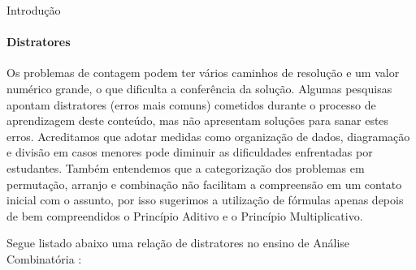 \begin{apresentacao}{Introdução}
\begin{itemize}
\end{itemize}

\paragraph{Distratores}

Os problemas de contagem podem ter vários caminhos de resolução e um valor numérico grande, o que dificulta a conferência da solução. Algumas pesquisas apontam distratores (erros mais comuns) cometidos durante o processo de aprendizagem deste conteúdo, mas não apresentam soluções para sanar estes erros. Acreditamos que adotar medidas como organização de dados, diagramação  e divisão em casos menores pode diminuir as dificuldades enfrentadas por estudantes. Também entendemos que a categorização dos problemas em permutação, arranjo e combinação não facilitam a compreensão em um contato inicial com o assunto, por isso sugerimos a utilização de fórmulas apenas depois de bem compreendidos o Princípio Aditivo e o Princípio Multiplicativo. 

Segue listado abaixo uma relação de distratores no ensino de Análise Combinatória :



\end{apresentacao}
